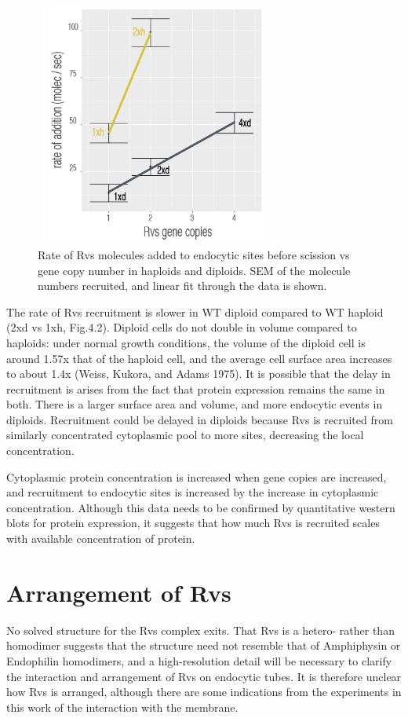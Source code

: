 	\begin{figure}[H]
	\centering
	\includegraphics[width=8cm,height=8cm,keepaspectratio]{figures/discussion/recruit_rate_final}
	\caption[Synaptojanin-like proteins in yeast]
{Rate of Rvs molecules added to endocytic sites before scission vs gene copy number in haploids and diploids. SEM of the molecule numbers recruited, and linear fit through the data is shown.
	\label{recruit_rate}}
\end{figure}

	\vspace{5mm}
The rate of Rvs recruitment is slower in WT diploid compared to WT haploid (2xd vs 1xh, Fig.4.2). Diploid cells do not double in volume compared to haploids: under normal growth conditions, the volume of the diploid cell is around 1.57x that of the haploid cell, and the average cell surface area increases to  about 1.4x (Weiss, Kukora, and Adams 1975). It is possible that the delay in recruitment is arises from the fact that protein expression remains the same in both. There is a larger surface area and volume, and more endocytic events in diploids. Recruitment could be delayed in diploids because Rvs is recruited from similarly concentrated cytoplasmic pool to more sites, decreasing the local concentration.

	\vspace{5mm}
Cytoplasmic protein concentration is increased when gene copies are increased, and recruitment to endocytic sites is increased by the increase in cytoplasmic concentration. Although this data needs to be confirmed by quantitative western blots for protein expression, it suggests that how much Rvs is recruited scales with available concentration of protein. 



\section{Arrangement of Rvs}
No solved structure for the Rvs complex exits. That Rvs is a hetero- rather than homodimer suggests that the structure need not resemble that of Amphiphysin or Endophilin homodimers, and a high-resolution detail will be necessary to clarify the interaction and arrangement of Rvs on endocytic tubes. It is therefore unclear how Rvs is arranged, although there are some indications from the experiments in this work of the interaction with the membrane.


